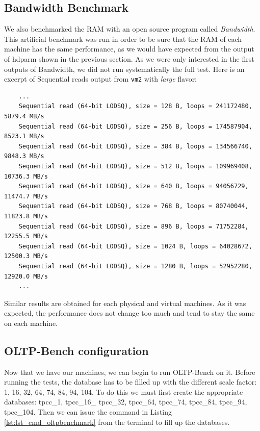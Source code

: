 \subsection{Bandwidth Benchmark}
We also benchmarked the RAM with an open source program called \textit{Bandwidth}. 
This artificial benchmark was run in order to be sure that the RAM of each machine has the same performance, as we would have expected from the output of hdparm shown in the previous section.
As we were only interested in the first outputs of Bandwidth, we did not run systematically the full test. Here is an excerpt of Sequential reads output from \texttt{vm2} with \textit{large} flavor:

\begingroup
	\singlespacing
    \fontsize{10pt}{12pt}\selectfont
\begin{verbatim}
    ...
    Sequential read (64-bit LODSQ), size = 128 B, loops = 241172480, 5879.4 MB/s
    Sequential read (64-bit LODSQ), size = 256 B, loops = 174587904, 8523.1 MB/s
    Sequential read (64-bit LODSQ), size = 384 B, loops = 134566740, 9848.3 MB/s
    Sequential read (64-bit LODSQ), size = 512 B, loops = 109969408, 10736.3 MB/s
    Sequential read (64-bit LODSQ), size = 640 B, loops = 94056729, 11474.7 MB/s
    Sequential read (64-bit LODSQ), size = 768 B, loops = 80740044, 11823.8 MB/s
    Sequential read (64-bit LODSQ), size = 896 B, loops = 71752284, 12255.5 MB/s
    Sequential read (64-bit LODSQ), size = 1024 B, loops = 64028672, 12500.3 MB/s
    Sequential read (64-bit LODSQ), size = 1280 B, loops = 52952280, 12920.0 MB/s
    ...
\end{verbatim}
\endgroup

Similar results are obtained for each physical and virtual machines. 
As it was expected, the performance does not change too much and tend to stay the same on each machine.

\subsection{OLTP-Bench configuration}
Now that we have our machines, we can begin to run OLTP-Bench on it. 
Before running the tests, the database has to be filled up with the different scale factor: 1, 16, 32, 64, 74, 84, 94, 104. 
To do this we must first create the appropriate databases: tpcc\_1, tpcc\_16\_ tpcc\_32, tpcc\_64, tpcc\_74, tpcc\_84, tpcc\_94, tpcc\_104. 
Then we can issue the command in Listing \ref{lst:lst_cmd_oltpbenchmark} from the terminal to fill up the databases.

